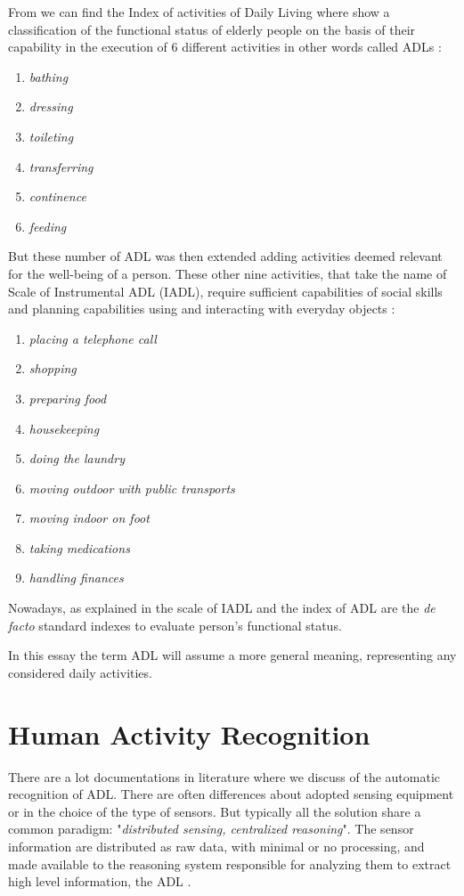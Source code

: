 \documentclass{thesisreport}
\begin{document}
From \cite{Multidisciplinary} we can find the Index of activities of Daily Living where show a classification of the functional status of elderly people on the basis of their capability in the execution of 6 different activities in other words called ADLs \cite{buoncompagni2017towards}:
\begin{enumerate}[noitemsep,topsep=1pt,parsep=1pt,partopsep=1pt]
    \item \textit{bathing}
    \item \textit{dressing}
    \item \textit{toileting}
    \item \textit{transferring}
    \item \textit{continence}
    \item \textit{feeding}
\end{enumerate}

But these number of ADL was then extended adding activities deemed relevant for the well-being of a person. These other nine activities, that take the name of Scale of Instrumental ADL \cite{lawton1970assessment} (IADL), require sufficient capabilities of social skills and planning capabilities using and interacting with everyday objects \cite{buoncompagni2017towards}:
\begin{enumerate}[noitemsep,topsep=1pt,parsep=1pt,partopsep=1pt]
    \item \textit{placing a telephone call}
    \item \textit{shopping}
    \item \textit{preparing food}
    \item \textit{housekeeping}
    \item \textit{doing the laundry}
    \item \textit{moving outdoor with public transports}
    \item \textit{moving indoor on foot}
    \item \textit{taking medications}
    \item \textit{handling finances}
\end{enumerate}
Nowadays, as explained in \cite{bruno2014public} the scale of IADL and the index of ADL are the \textit{de facto} standard indexes to evaluate person’s functional status\cite{buoncompagni2017towards}. 

In this essay the term ADL will assume a more general meaning, representing any  considered daily activities. 

\section{Human Activity Recognition}
There are a lot documentations in literature where we discuss of the automatic recognition of ADL. There are often differences about adopted sensing equipment or in the choice of the type of sensors. But typically all the solution share a common paradigm: "\textit{distributed sensing, centralized reasoning}". The sensor information are distributed as raw data, with minimal or no processing, and made available to the reasoning system responsible for analyzing them to extract high level information, the ADL \cite{buoncompagni2017towards}.   
\end{document}
